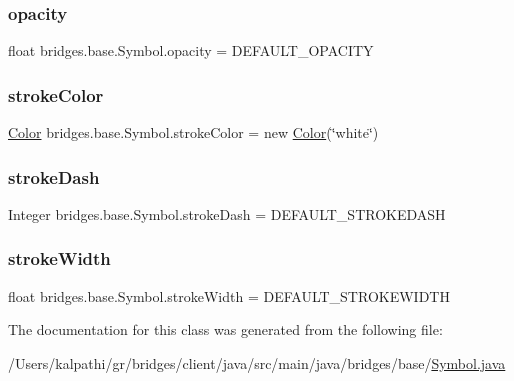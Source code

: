 \subsubsection{\texorpdfstring{opacity}{opacity}}
{\footnotesize\ttfamily float bridges.\+base.\+Symbol.\+opacity = D\+E\+F\+A\+U\+L\+T\+\_\+\+O\+P\+A\+C\+I\+TY\hspace{0.3cm}{\ttfamily [protected]}}

\mbox{\label{classbridges_1_1base_1_1_symbol_a51a9a36983b00156284d86ca80cccfb0}} 
\subsubsection{\texorpdfstring{stroke\+Color}{strokeColor}}
{\footnotesize\ttfamily \mbox{\hyperlink{classbridges_1_1base_1_1_color}{Color}} bridges.\+base.\+Symbol.\+stroke\+Color = new \mbox{\hyperlink{classbridges_1_1base_1_1_color}{Color}}(\char`\"{}white\char`\"{})\hspace{0.3cm}{\ttfamily [protected]}}

\mbox{\label{classbridges_1_1base_1_1_symbol_a04134e835474c4747e334389f00513c0}} 
\subsubsection{\texorpdfstring{stroke\+Dash}{strokeDash}}
{\footnotesize\ttfamily Integer bridges.\+base.\+Symbol.\+stroke\+Dash = D\+E\+F\+A\+U\+L\+T\+\_\+\+S\+T\+R\+O\+K\+E\+D\+A\+SH\hspace{0.3cm}{\ttfamily [protected]}}

\mbox{\label{classbridges_1_1base_1_1_symbol_af00affe40d45a600e3b8c79fce6c9505}} 
\subsubsection{\texorpdfstring{stroke\+Width}{strokeWidth}}
{\footnotesize\ttfamily float bridges.\+base.\+Symbol.\+stroke\+Width = D\+E\+F\+A\+U\+L\+T\+\_\+\+S\+T\+R\+O\+K\+E\+W\+I\+D\+TH\hspace{0.3cm}{\ttfamily [protected]}}



The documentation for this class was generated from the following file\+:\begin{DoxyCompactItemize}
\item 
/\+Users/kalpathi/gr/bridges/client/java/src/main/java/bridges/base/\mbox{\hyperlink{_symbol_8java}{Symbol.\+java}}\end{DoxyCompactItemize}
